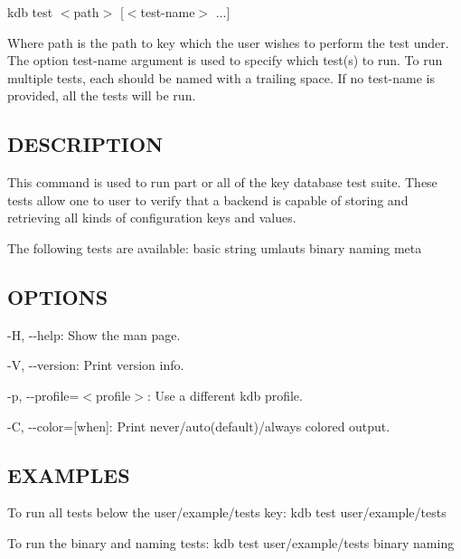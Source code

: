 {\ttfamily kdb test $<$path$>$ \mbox{[}$<$test-\/name$>$ ...\mbox{]}}

Where {\ttfamily path} is the path to key which the user wishes to perform the test under. The option {\ttfamily test-\/name} argument is used to specify which test(s) to run. To run multiple tests, each should be named with a trailing space. If no {\ttfamily test-\/name} is provided, all the tests will be run.

\subsection*{D\+E\+S\+C\+R\+I\+P\+T\+I\+O\+N}

This command is used to run part or all of the key database test suite. These tests allow one to user to verify that a backend is capable of storing and retrieving all kinds of configuration keys and values.

The following tests are available\+: basic string umlauts binary naming meta

\subsection*{O\+P\+T\+I\+O\+N\+S}


\begin{DoxyItemize}
\item {\ttfamily -\/\+H}, {\ttfamily -\/-\/help}\+: Show the man page.
\item {\ttfamily -\/\+V}, {\ttfamily -\/-\/version}\+: Print version info.
\item {\ttfamily -\/p}, {\ttfamily -\/-\/profile}=$<$profile$>$\+: Use a different kdb profile.
\item {\ttfamily -\/\+C}, {\ttfamily -\/-\/color}=\mbox{[}when\mbox{]}\+: Print never/auto(default)/always colored output.
\end{DoxyItemize}

\subsection*{E\+X\+A\+M\+P\+L\+E\+S}

To run all tests below the {\ttfamily user/example/tests} key\+: {\ttfamily kdb test user/example/tests}

To run the {\ttfamily binary} and {\ttfamily naming} tests\+: {\ttfamily kdb test user/example/tests binary naming} 